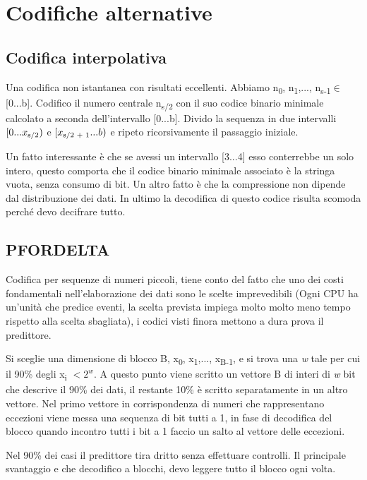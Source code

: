 \documentclass[12pt,italian]{report}
\begin{document}
\section{Codifiche alternative}
\label{Codifichealternative}

\subsection{Codifica interpolativa}
\label{codifica interpolativa} 
Una codifica non istantanea con risultati eccellenti. Abbiamo n\textsubscript{0}, n\textsubscript{1},..., n\textsubscript{s-1}$\in$[0...b]. Codifico il numero centrale n\textsubscript{s/2} con il suo codice binario minimale calcolato a seconda dell'intervallo [0...b]. Divido la sequenza in due intervalli $[0... x\textsubscript{s/2})$ e $[x\textsubscript{s/2 + 1}... b)$ e ripeto ricorsivamente il passaggio iniziale.

Un fatto interessante è che se avessi un intervallo [3...4] esso conterrebbe un solo intero, questo comporta che il codice binario minimale associato è la stringa vuota, senza consumo di bit. Un altro fatto è che la compressione non dipende dal distribuzione dei dati. In ultimo la decodifica di questo codice risulta scomoda perché devo decifrare tutto. 

\subsection{PFORDELTA}
\label{pfordelta}
Codifica per sequenze di numeri piccoli, tiene conto del fatto che uno dei costi fondamentali nell'elaborazione dei dati sono le scelte imprevedibili (Ogni CPU ha un'unità che predice eventi, la scelta prevista impiega molto molto meno tempo rispetto alla scelta sbagliata), i codici visti finora mettono a dura prova il predittore.

Si sceglie una dimensione di blocco B, x\textsubscript{0}, x\textsubscript{1},..., x\textsubscript{B-1}, e si trova una \textit{w} tale per cui il 90\% degli x\textsubscript{i} $<2^w$. A questo punto viene scritto un vettore B di interi di \textit{w} bit che descrive il 90\% dei dati, il restante 10\% è scritto separatamente in un altro vettore.
Nel primo vettore in corrispondenza di numeri che rappresentano eccezioni viene messa una sequenza di bit tutti a 1, in fase di decodifica del blocco quando incontro tutti i bit a 1 faccio un salto al vettore delle eccezioni.

Nel 90\% dei casi il predittore tira dritto senza effettuare controlli. Il principale svantaggio e che decodifico a blocchi, devo leggere tutto il blocco ogni volta.
\end{document}

